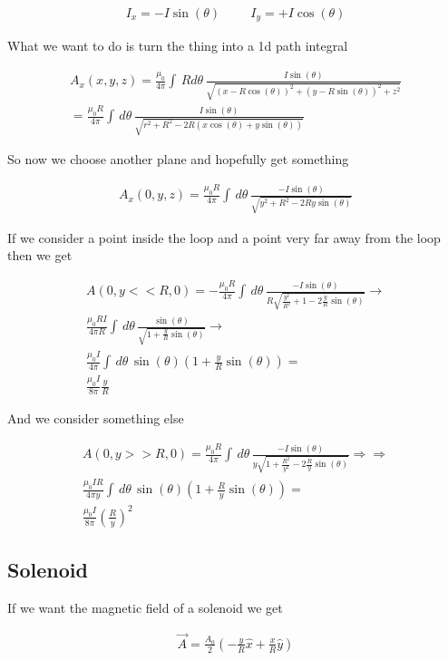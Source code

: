 \documentclass[fleqn]{report}
\newcommand{\hp}{\hspace{1cm}}
\newcommand{\equations} [1] {
\begin{gather*}
#1
\end{gather*}
}
\begin{document}
\equations{
    I_x = - I \sin(\theta)
    \hp
    I_y = + I \cos(\theta)
}

What we want to do is turn the thing into a 1d path integral 

\equations{
    A_x(x, y, z)
    =
    \frac{\mu_0}{4 \pi}
    \int \, R d \theta \, 
    \frac{I \sin(\theta)}{
        \sqrt{(x - R\cos(\theta))^2 +(y - R\sin(\theta))^2 + z^2}
    }
    \\
    =
    \frac{\mu_0 R}{4 \pi}
    \int \, d \theta \, 
    \frac{I \sin(\theta)}{
        \sqrt{r^2 + R^2 - 2R(x \cos(\theta) + y\sin(\theta))}
    }
}

So now we choose another plane and hopefully get something 

\equations{
    A_x(0, y, z)
    =
    \frac{\mu_0 R}{4 \pi}
    \int \, d \theta \, 
    \frac{-I \sin(\theta)}{
        \sqrt{y^2 + R^2 - 2R y\sin(\theta)}
    }
}

If we consider a point inside the loop and a point very far away from 
the loop then we get 

\equations{
    A(0, y <<  R, 0)
    =
    -\frac{\mu_0 R}{4 \pi}
    \int \, d \theta \, 
    \frac{-I \sin(\theta)}{
        R \sqrt{\frac{y^2}{R^2} + 1 - 2 \frac{y}{R}\sin(\theta)}
    }
    \rightarrow 
    \\
    \frac{\mu_0 R I}{4 \pi R}
    \int \, d \theta \, 
    \frac{\sin(\theta)}{
        \sqrt{1 + \frac{y}{R} \sin(\theta)}
    }
    \rightarrow 
    \\
    \frac{\mu_0 I}{4 \pi}
    \int \, d \theta \, 
    \sin(\theta)
    \left( 1 + \frac{y}{R} \sin(\theta) \right)
    =
    \\
    \frac{\mu_0 I}{8 \pi } \frac{y}{R}
}

And we consider something else 

\equations{
    A(0, y >> R, 0)
    =
    \frac{\mu_0 R}{4 \pi}
    \int \, d \theta \, 
    \frac{-I \sin(\theta)}{
        y \sqrt{1 + \frac{R^2}{y^2} - 2 \frac{R}{y}\sin(\theta)}
    }
    \Rightarrow \Rightarrow
    \\ 
    \frac{\mu_0 I R}{4 \pi y}
    \int \, d \theta \, 
    \sin(\theta)
    \left( 1 + \frac{R}{y} \sin(\theta) \right)
    =
    \\
    \frac{\mu_0 I}{8 \pi } \left(\frac{R}{y}\right)^2
}

\subsection{Solenoid}
If we want the magnetic field of a solenoid we get 
\equations{
    \vec A 
    =
    \frac{A_0}{2}
    \left(
        - \frac{y}{R} \hat x + \frac{x}{R} \hat y 
    \right)
}
\end{document}
